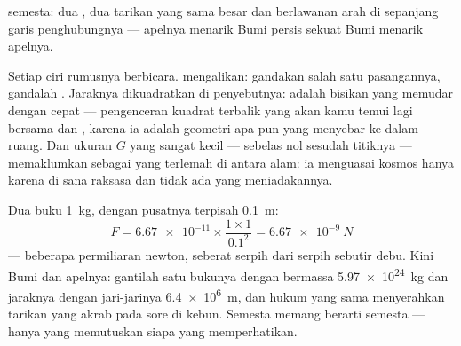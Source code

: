 \begin{omfigure}

{\small {} semesta: dua , dua tarikan yang sama besar dan
berlawanan arah di sepanjang garis penghubungnya --- apelnya menarik
Bumi persis sekuat Bumi menarik apelnya.}
\end{omfigure}

\begin{example}\label{ex:g9:gravitation:reading}
Setiap ciri rumusnya berbicara.  mengalikan: gandakan salah
satu pasangannya, gandalah . Jaraknya dikuadratkan di
penyebutnya:  adalah bisikan yang memudar dengan cepat ---
pengenceran kuadrat terbalik yang akan kamu temui lagi bersama 
dan , karena ia adalah geometri apa pun yang menyebar ke dalam
ruang. Dan ukuran $G$ yang sangat kecil --- sebelas nol sesudah
titiknya --- memaklumkan  sebagai yang terlemah di antara
 alam: ia menguasai kosmos hanya karena  di sana raksasa dan
tidak ada yang meniadakannya.
\end{example}

\begin{example}\label{ex:g9:gravitation:books}
Dua buku \qty{1}{kg}, dengan pusatnya terpisah \qty{0.1}{m}:
\[
F = \num{6.67e-11} \times \frac{1 \times 1}{0.1^2}
= \qty{6.67e-9}{N}
\]
--- beberapa permiliaran newton, seberat serpih dari serpih sebutir
debu. Kini Bumi dan apelnya: gantilah satu bukunya dengan 
bermassa \qty{5.97e24}{kg} dan jaraknya dengan jari-jarinya
\qty{6.4e6}{m}, dan hukum yang sama menyerahkan tarikan yang akrab
pada sore di kebun. Semesta memang berarti semesta --- hanya 
yang memutuskan siapa yang memperhatikan.
\end{example}


